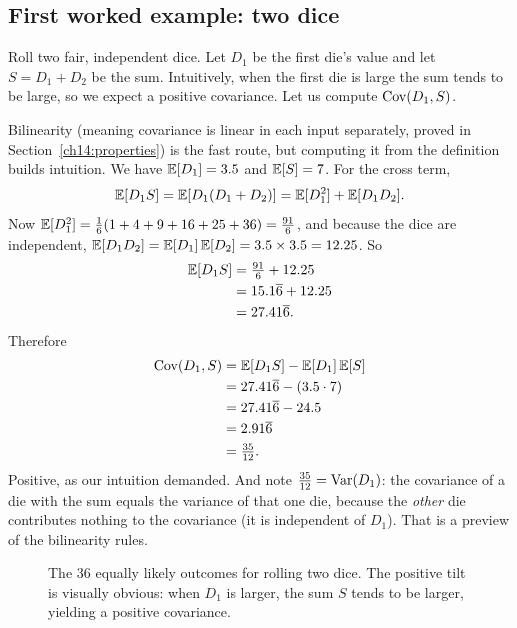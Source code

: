 \subsection{First worked example: two dice}

\begin{example}
\label{ch14:ex-dice}
Roll two fair, independent dice. Let $D_1$ be the first die's value and let
$S = D_1 + D_2$ be the sum. Intuitively, when the first die is large the sum tends
to be large, so we expect a positive covariance. Let us compute $\operatorname{Cov}(D_1, S)$.

Bilinearity (meaning covariance is linear in each input separately, proved in Section~\ref{ch14:properties}) is the fast route, but computing it from the definition builds intuition. We have $\operatorname{\mathbb{E}}[D_1] = 3.5$ and $\operatorname{\mathbb{E}}[S] = 7$.
For the cross term,
\[
\operatorname{\mathbb{E}}[D_1 S] = \operatorname{\mathbb{E}}[D_1(D_1 + D_2)] = \operatorname{\mathbb{E}}[D_1^2] + \operatorname{\mathbb{E}}[D_1 D_2].
\]
Now $\operatorname{\mathbb{E}}[D_1^2] = \tfrac{1}{6}(1 + 4 + 9 + 16 + 25 + 36) = \tfrac{91}{6}$, and
because the dice are independent, $\operatorname{\mathbb{E}}[D_1 D_2] = \operatorname{\mathbb{E}}[D_1]\operatorname{\mathbb{E}}[D_2] = 3.5 \times 3.5
= 12.25$. So
\begin{align*}
\operatorname{\mathbb{E}}[D_1 S] &= \tfrac{91}{6} + 12.25 \\
&= 15.1\overline{6} + 12.25 \\
&= 27.41\overline{6}.
\end{align*}
Therefore
\begin{align*}
\operatorname{Cov}(D_1, S) &= \operatorname{\mathbb{E}}[D_1 S] - \operatorname{\mathbb{E}}[D_1]\operatorname{\mathbb{E}}[S] \\
&= 27.41\overline{6} - (3.5 \cdot 7) \\
&= 27.41\overline{6} - 24.5 \\
&= 2.91\overline{6} \\
&= \tfrac{35}{12}.
\end{align*}
Positive, as our intuition demanded. And note $\tfrac{35}{12} = \operatorname{Var}(D_1)$: the
covariance of a die with the sum equals the variance of that one die, because the
\emph{other} die contributes nothing to the covariance (it is independent of
$D_1$). That is a preview of the bilinearity rules.

\begin{figure}[H]
\centering
{}
\caption{The 36 equally likely outcomes for rolling two dice. The positive tilt is visually obvious: when $D_1$ is larger, the sum $S$ tends to be larger, yielding a positive covariance.}
\label{ch14:fig-dice-scatter}
\end{figure}


\end{example}

